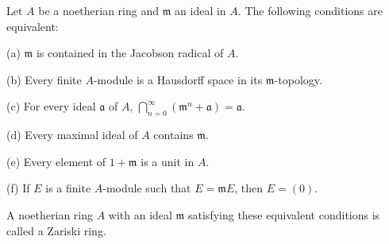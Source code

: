 Let $A$ be a noetherian ring and $\mathfrak{m}$ an ideal in $A$. The following conditions are equivalent:

(a) $\mathfrak{m}$ is contained in the Jacobson radical of $A$.

(b) Every finite $A$-module is a Hausdorff space in its $\mathfrak{m}$-topology.

(c) For every ideal $\mathfrak{a}$ of $A$, $\bigcap_{n=0}^{\infty} (\mathfrak{m}^n + \mathfrak{a}) = \mathfrak{a}$.

(d) Every maximal ideal of $A$ contains $\mathfrak{m}$.

(e) Every element of $1 + \mathfrak{m}$ is a unit in $A$.

(f) If $E$ is a finite $A$-module such that $E = \mathfrak{m}E$, then $E = (0)$.

A noetherian ring $A$ with an ideal $\mathfrak{m}$ satisfying these equivalent conditions is called a Zariski ring.